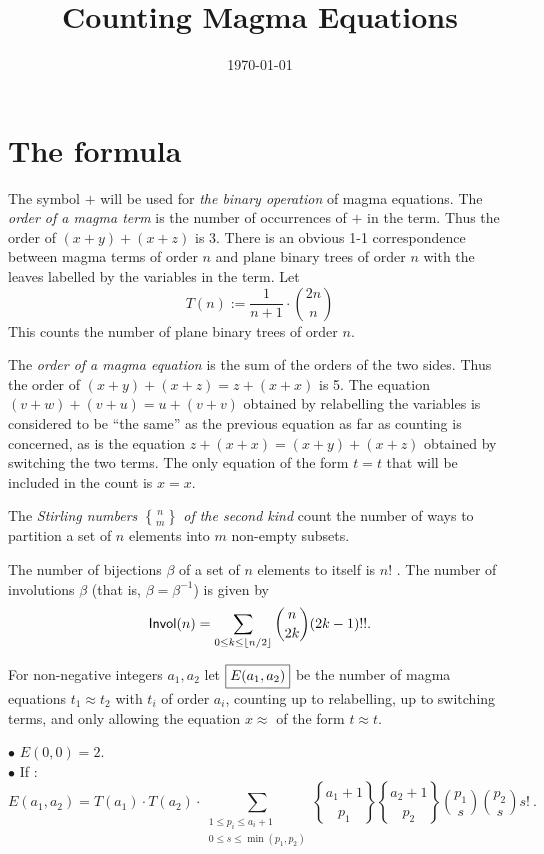 \documentclass[12pt]{amsart}
\title{Counting Magma Equations}
\date{\today}
\newcommand{\Invol}{{\sf Invol}}
\begin{document}
\maketitle

\section{The formula}
The symbol $+$ will be used for {\it the binary operation} of magma equations. The {\it order of a magma term} is the number of occurrences of $+$ in the term. Thus the order of $(x+y) + (x + z)$ is 3. There is an obvious 1-1 correspondence between magma terms of order $n$ and plane binary trees of order $n$ with the leaves labelled by the variables in the term. Let
$$
T(n) := \frac{1}{n+1} \cdot {2n \choose n}
$$
This counts the number of plane binary trees of order $n$.

The {\it order of a magma equation} is the sum of the orders of the two sides. Thus the order of $(x+y) +(x+z) = z + (x +x)$ is 5. 
The equation $(v+w) +(v+u) = u + (v +v)$ obtained by relabelling the variables is considered to be ``the same'' as the previous equation as far as counting is concerned, as is the equation 
$ z + (x +x) = (x+y) +(x+z) $
obtained by switching the two terms. The only equation of the form $t = t$ that will be included in the count is $x=x$.

The {\it Stirling numbers $n \brace m$ of the second kind} count the number of ways to partition a set of $n$ elements into $m$ non-empty subsets.

The number of bijections $\beta$ of a set of $n$ elements to itself is $n!$ .
The number of involutions $\beta$ (that is, $\beta = \beta^{-1}$) is given by
$$
\Invol(n) = \sum_{0 \leq k \leq \lfloor n/2 \rfloor}  {n\choose 2k} (2k-1)!!.
$$

For non-negative integers $a_1, a_2$ let $\fbox{$E(a_1,a_2)$}$ be the number of magma equations 
$t_1 \approx t_2$ with $t_i$ of order $a_i$, counting up to relabelling, up to switching terms, and only allowing the equation $x\approx$ of the form $t \approx t$. 

\pagebreak

$\bullet$ $E(0,0) = 2$.\\

$\bullet$ If : 
$$
E(a_1,a_2) = T(a_1)\cdot T(a_2)\cdot \sum_{\substack{1 \le p_i \le a_i+1\\0\le s \le \min(p_1,p_2)}} 
{a_1+1 \brace p_1} {a_2+1 \brace p_2} {p_1 \choose s} {p_2 \choose s} s! \ .
$$
\end{document}
